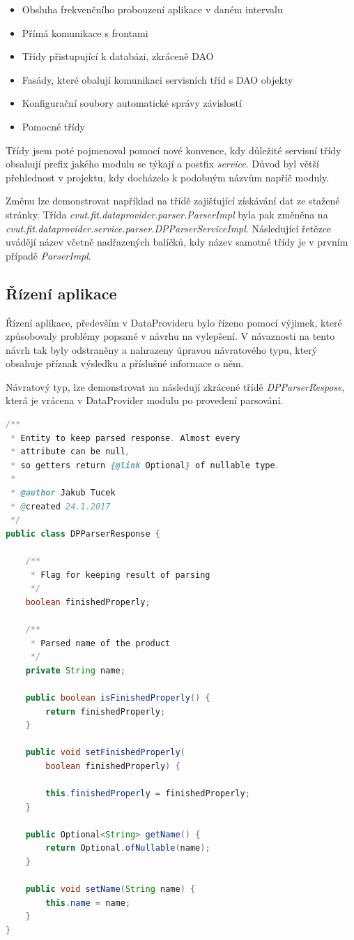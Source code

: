 \documentclass[thesis=B,czech]{FITthesis}[2012/06/26]
\begin{document}
\begin{itemize}
\item Obsluha frekvenčního probouzení aplikace v daném intervalu
\item Přímá komunikace s frontami
\item Třídy přistupující k databázi, zkráceně DAO
\item Fasády, které obalují komunikaci servisních tříd s DAO objekty
\item Konfigurační soubory automatické správy závislostí
\item Pomocné třídy
\end{itemize}

Třídy jsem poté pojmenoval pomocí nové konvence, kdy důležité servisní třídy obsahují prefix jakého modulu se týkají
a postfix \textit{service}. Důvod byl větší přehlednost v projektu, kdy docházelo k podobným názvům napříč moduly.
\par
Změnu lze demonstrovat například na třídě zajišťující získávání dat ze stažené stránky. Třída \textit{cvut.fit.dataprovider.parser.ParserImpl} byla pak změněna na \textit{cvut.fit.dataprovider.service.parser.DPParserServiceImpl}. Následující řetězce uvádějí název včetně 
nadřazených balíčků, kdy název samotné třídy je v prvním případě \textit{ParserImpl}.

\subsection{Řízení aplikace}
Řízení aplikace, především v DataProvideru bylo řízeno pomocí výjimek, které způsobovaly problémy popsané v návrhu na vylepšení.
V návaznosti na tento návrh tak byly odstraněny a nahrazeny úpravou návratového typu, který obsahuje příznak výsledku 
a příslušné informace o něm.
\par
Návratový typ, lze demonstrovat na následují zkrácené třídě \textit{DPParserRespose}, která je vrácena v DataProvider modulu
po provedení parsování.

\begin{lstlisting}[language=Java]
/**
 * Entity to keep parsed response. Almost every 
 * attribute can be null, 
 * so getters return {@link Optional} of nullable type.
 *
 * @author Jakub Tucek
 * @created 24.1.2017
 */
public class DPParserResponse {

    /**
     * Flag for keeping result of parsing
     */
    boolean finishedProperly;

    /**
     * Parsed name of the product
     */
    private String name;

    public boolean isFinishedProperly() {
        return finishedProperly;
    }

    public void setFinishedProperly(
    	boolean finishedProperly) {
    	
        this.finishedProperly = finishedProperly;
    }

    public Optional<String> getName() {
        return Optional.ofNullable(name);
    }

    public void setName(String name) {
        this.name = name;
    }
}
\end{lstlisting}
\end{document}
